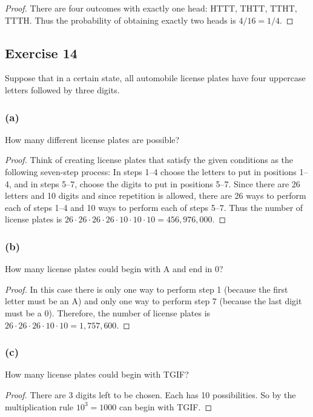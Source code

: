 \documentclass[14pt]{extarticle}
\begin{document}
\begin{proof}
There are four outcomes with exactly one head: HTTT, THTT, TTHT, TTTH. Thus the probability of obtaining exactly two 
heads is \(4/16 = 1/4\).
\end{proof}

\subsection{Exercise 14}
Suppose that in a certain state, all automobile license plates have four uppercase letters followed by three 
digits.

\subsubsection{(a)}
How many different license plates are possible?

\begin{proof}
Think of creating license plates that satisfy the given conditions as the following seven-step process: In steps 
1–4 choose the letters to put in positions 1–4, and in steps 5–7, choose the digits to put in positions 5–7. Since 
there are 26 letters and 10 digits and since repetition is allowed, there are 26 ways to perform each of steps 1–4 and 
10 ways to perform each of steps 5–7. Thus the number of license plates is \(26 \cdot 26 \cdot 26 \cdot 26 \cdot 10 
\cdot 10 \cdot 10 = 456,976,000\).
\end{proof}

\subsubsection{(b)}
How many license plates could begin with A and end in 0?
\begin{proof}
In this case there is only one way to perform step 1 (because the first letter must be an A) and only one way to 
perform step 7 (because the last digit must be a 0). Therefore, the number of license plates is 
\(26 \cdot 26 \cdot 26 \cdot 10 \cdot 10 = 1,757,600\).
\end{proof}

\subsubsection{(c)}
How many license plates could begin with TGIF?

\begin{proof}
There are 3 digits left to be chosen. Each has 10 possibilities. So by the multiplication rule \(10^3=1000\)
can begin with TGIF.
\end{proof}
\end{document}

